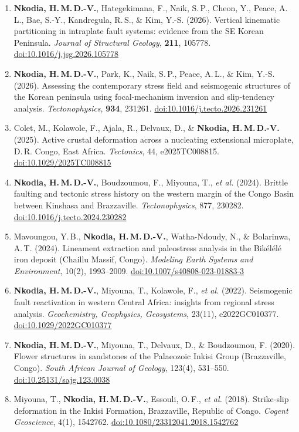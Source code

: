 \documentclass[10.5pt,a4paper]{article}
\begin{document}
\begin{enumerate}[leftmargin=1.5em, itemsep=2pt, topsep=2pt, label=\arabic*.]
\item \textbf{Nkodia, H.\,M.\,D.-V.}, Hategekimana, F., Naik, S.\,P., Cheon, Y., Peace, A.\,L., Bae, S.-Y., Kandregula, R.\,S., \& Kim, Y.-S. (2026). Vertical kinematic partitioning in intraplate fault systems: evidence from the SE Korean Peninsula. \emph{Journal of Structural Geology}, \textbf{211}, 105778. \href{https://doi.org/10.1016/j.jsg.2026.105778}{doi:10.1016/j.jsg.2026.105778}
\item \textbf{Nkodia, H.\,M.\,D.-V.}, Park, K., Naik, S.\,P., Peace, A.\,L., \& Kim, Y.-S. (2026). Assessing the contemporary stress field and seismogenic structures of the Korean peninsula using focal-mechanism inversion and slip-tendency analysis. \emph{Tectonophysics}, \textbf{934}, 231261. \href{https://doi.org/10.1016/j.tecto.2026.231261}{doi:10.1016/j.tecto.2026.231261}
\item Colet, M., Kolawole, F., Ajala, R., Delvaux, D., \& \textbf{Nkodia, H.\,M.\,D.-V.} (2025). Active crustal deformation across a nucleating extensional microplate, D.\,R. Congo, East Africa. \emph{Tectonics}, 44, e2025TC008815. \href{https://doi.org/10.1029/2025TC008815}{doi:10.1029/2025TC008815}
\item \textbf{Nkodia, H.\,M.\,D.-V.}, Boudzoumou, F., Miyouna, T., \emph{et al.} (2024). Brittle faulting and tectonic stress history on the western margin of the Congo Basin between Kinshasa and Brazzaville. \emph{Tectonophysics}, 877, 230282. \href{https://doi.org/10.1016/j.tecto.2024.230282}{doi:10.1016/j.tecto.2024.230282}
\item Mavoungou, Y.\,B., \textbf{Nkodia, H.\,M.\,D.-V.}, Watha-Ndoudy, N., \& Bolarinwa, A.\,T. (2024). Lineament extraction and paleostress analysis in the Bikélélé iron deposit (Chaillu Massif, Congo). \emph{Modeling Earth Systems and Environment}, 10(2), 1993–2009. \href{https://doi.org/10.1007/s40808-023-01883-3}{doi:10.1007/s40808-023-01883-3}
\item \textbf{Nkodia, H.\,M.\,D.-V.}, Miyouna, T., Kolawole, F., \emph{et al.} (2022). Seismogenic fault reactivation in western Central Africa: insights from regional stress analysis. \emph{Geochemistry, Geophysics, Geosystems}, 23(11), e2022GC010377. \href{https://doi.org/10.1029/2022GC010377}{doi:10.1029/2022GC010377}
\item \textbf{Nkodia, H.\,M.\,D.-V.}, Miyouna, T., Delvaux, D., \& Boudzoumou, F. (2020). Flower structures in sandstones of the Palaeozoic Inkisi Group (Brazzaville, Congo). \emph{South African Journal of Geology}, 123(4), 531–550. \href{https://doi.org/10.25131/sajg.123.0038}{doi:10.25131/sajg.123.0038}
\item Miyouna, T., \textbf{Nkodia, H.\,M.\,D.-V.}, Essouli, O.\,F., \emph{et al.} (2018). Strike-slip deformation in the Inkisi Formation, Brazzaville, Republic of Congo. \emph{Cogent Geoscience}, 4(1), 1542762. \href{https://doi.org/10.1080/23312041.2018.1542762}{doi:10.1080/23312041.2018.1542762}
\end{enumerate}
\end{document}
